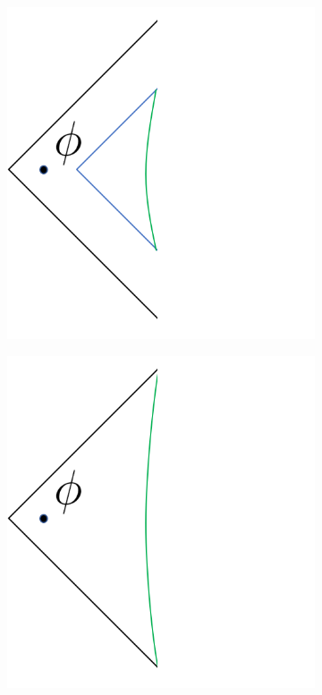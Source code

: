 \documentclass[12pt]{article}
\begin{document}
\begin{figure} [t]
\centering
\begin{subfigure}{.48\textwidth}
  \centering
 \includegraphics[width = 0.8\linewidth]{SYK_Untuned.png}
 \caption{}
 \label{fig:sykuntuned}
\end{subfigure}
\begin{subfigure}{.48\textwidth}
 \includegraphics[width = 0.8\linewidth]{SYK_Tuned.png}
 \centering
 \caption{}
 \label{fig:syktuned}

\end{subfigure}
\end{figure}
\end{document}
